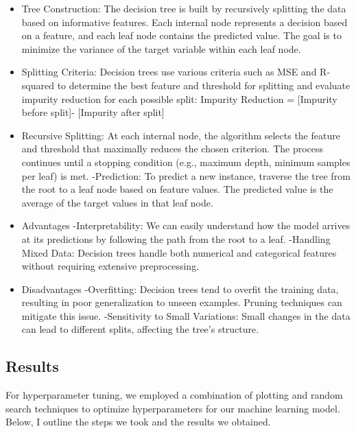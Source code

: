 \documentclass[12pt]{report}
\begin{document}
\begin{itemize}
    \item Tree Construction:
The decision tree is built by recursively splitting the data based on informative features. Each internal node represents a decision based on a feature, and each leaf node contains the predicted value. The goal is to minimize the variance of the target variable within each leaf node.

    \item Splitting Criteria:
Decision trees use various criteria such as MSE and R-squared to determine the best feature and threshold for splitting and evaluate impurity reduction for each possible split:
Impurity Reduction = [Impurity before split]- [Impurity after split]

    \item Recursive Splitting:
At each internal node, the algorithm selects the feature and threshold that maximally reduces the chosen criterion. The process continues until a stopping condition (e.g., maximum depth, minimum samples per leaf) is met.
-Prediction:
To predict a new instance, traverse the tree from the root to a leaf node based on feature values. The predicted value is the average of the target values in that leaf node.

    \item Advantages
-Interpretability: 
We can easily understand how the model arrives at its predictions by following the path from the root to a leaf.
-Handling Mixed Data: 
Decision trees handle both numerical and categorical features without requiring extensive preprocessing.
    \item  Disadvantages
-Overfitting: 
Decision trees tend to overfit the training data, resulting in poor generalization to unseen examples. Pruning techniques can mitigate this issue.
-Sensitivity to Small Variations: 
Small changes in the data can lead to different splits, affecting the tree’s structure.


\end{itemize}


\subsection{Results}







For hyperparameter tuning, we employed a combination of plotting and random search techniques to optimize hyperparameters for our machine learning model. Below, I outline the steps we took and the results we obtained.
\end{document}
